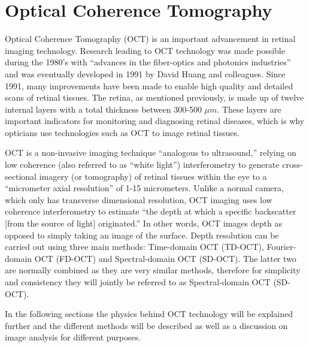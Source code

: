 \chapter{Optical Coherence Tomography}

\label{optical_coherence_tomography}

Optical Coherence Tomography (OCT) is an important advancement in retinal imaging technology.  Research leading to OCT technology was made possible during the 1980’s with “advances in the fiber-optics and photonics industries” and was eventually developed in 1991 by David Huang and colleagues.\cite{mbib_1,mbib_2,mbib_3}  Since 1991, many improvements have been made to enable high quality and detailed scans of retinal tissues.  The retina, as mentioned previously, is made up of twelve internal layers with a total thickness between 300-500 $\mu m$.\cite{mbib_4} These layers are important indicators for monitoring and diagnosing retinal diseases, which is why opticians use technologies such as OCT to image retinal tissues.

OCT is a non-invasive imaging technique “analogous to ultrasound,” relying on low coherence (also referred to as “white light”) interferometry to generate cross-sectional imagery (or tomography) of retinal tissues within the eye to a “micrometer axial resolution” of 1-15 micrometers.\cite{mbib_5, mbib_6,mbib_2} Unlike a normal camera, which only has transverse dimensional resolution, OCT imaging uses low coherence interferometry to estimate “the depth at which a specific backscatter [from the source of light] originated.” \cite{mbib_4}  In other words, OCT images depth as opposed to simply taking an image of the surface.  Depth resolution can be carried out using three main methods: Time-domain OCT (TD-OCT), Fourier-domain OCT (FD-OCT) and Spectral-domain OCT (SD-OCT).  The latter two are normally combined as they are very similar methods, therefore for simplicity and consistency they will jointly be referred to as Spectral-domain OCT (SD-OCT).

In the following sections the physics behind OCT technology will be explained further and the different methods will be described as well as a discussion on image analysis for different purposes.

